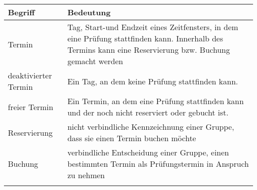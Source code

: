 \documentclass[]{article}
\begin{document}
\begin{longtable}[]{@{}ll@{}}
\toprule
\begin{minipage}[b]{0.42\columnwidth}\raggedright
Begriff\strut
\end{minipage} & \begin{minipage}[b]{0.52\columnwidth}\raggedright
Bedeutung\strut
\end{minipage}\tabularnewline
\midrule
\endhead
\begin{minipage}[t]{0.42\columnwidth}\raggedright
Termin\strut
\end{minipage} & \begin{minipage}[t]{0.52\columnwidth}\raggedright
Tag, Start-und Endzeit eines Zeitfensters, in dem eine Prüfung
stattfinden kann. Innerhalb des Termins kann eine Reservierung bzw.
Buchung gemacht werden\strut
\end{minipage}\tabularnewline
\begin{minipage}[t]{0.42\columnwidth}\raggedright
deaktivierter Termin\strut
\end{minipage} & \begin{minipage}[t]{0.52\columnwidth}\raggedright
Ein Tag, an dem keine Prüfung stattfinden kann.\strut
\end{minipage}\tabularnewline
\begin{minipage}[t]{0.42\columnwidth}\raggedright
freier Termin\strut
\end{minipage} & \begin{minipage}[t]{0.52\columnwidth}\raggedright
Ein Termin, an dem eine Prüfung stattfinden kann und der noch nicht
reserviert oder gebucht ist.\strut
\end{minipage}\tabularnewline
\begin{minipage}[t]{0.42\columnwidth}\raggedright
Reservierung\strut
\end{minipage} & \begin{minipage}[t]{0.52\columnwidth}\raggedright
nicht verbindliche Kennzeichnung einer Gruppe, dass sie einen Termin
buchen möchte\strut
\end{minipage}\tabularnewline
\begin{minipage}[t]{0.42\columnwidth}\raggedright
Buchung\strut
\end{minipage} & \begin{minipage}[t]{0.52\columnwidth}\raggedright
verbindliche Entscheidung einer Gruppe, einen bestimmten Termin als
Prüfungstermin in Anspruch zu nehmen\strut
\end{minipage}\tabularnewline
\begin{minipage}[t]{0.42\columnwidth}\raggedright

\end{minipage}
\end{longtable}
\end{document}
